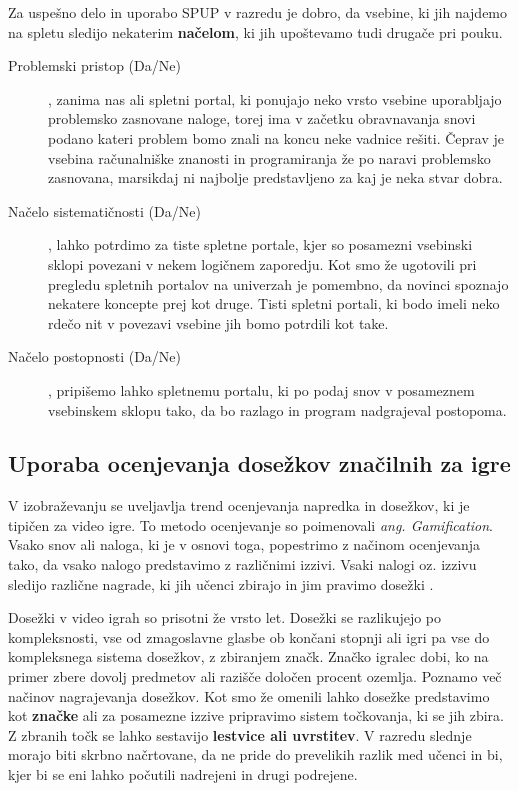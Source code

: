Za uspešno delo in uporabo SPUP v razredu je dobro, da vsebine, ki jih
najdemo na spletu sledijo nekaterim \textbf{načelom}, ki jih
upoštevamo tudi drugače pri pouku.

\begin{description}
\item[Problemski pristop (Da/Ne)], zanima nas ali spletni portal,
  ki ponujajo neko vrsto vsebine uporabljajo problemsko zasnovane
  naloge, torej ima v začetku obravnavanja snovi podano kateri problem
  bomo znali na koncu neke vadnice rešiti. Čeprav je vsebina 
  računalniške znanosti in programiranja že po naravi problemsko
  zasnovana, marsikdaj ni najbolje predstavljeno za kaj je neka stvar
  dobra.
\item[Načelo sistematičnosti (Da/Ne)], lahko potrdimo za tiste
  spletne portale, kjer so posamezni vsebinski sklopi povezani v nekem
  logičnem zaporedju. Kot smo že ugotovili pri pregledu spletnih
  portalov na univerzah je pomembno, da novinci spoznajo nekatere
  koncepte prej kot druge. Tisti spletni portali, ki bodo imeli neko
  rdečo nit v povezavi vsebine jih bomo potrdili kot take.
\item[Načelo postopnosti (Da/Ne)], pripišemo lahko spletnemu portalu,
  ki po podaj snov v posameznem vsebinskem sklopu tako, da bo razlago
  in program nadgrajeval postopoma. 
\end{description}

\subsection{Uporaba ocenjevanja dosežkov značilnih za igre}
\label{sec:uporaba_dosežkov}

V izobraževanju se uveljavlja trend ocenjevanja napredka in dosežkov,
ki je tipičen za video igre. To metodo ocenjevanje so poimenovali
\emph{ang. Gamification}. Vsako snov ali naloga, ki je v osnovi toga,
popestrimo z načinom ocenjevanja tako, da vsako nalogo predstavimo z
različnimi izzivi. Vsaki nalogi oz. izzivu sledijo različne nagrade,
ki jih učenci zbirajo in jim pravimo dosežki \cite{web:edublogger}.

Dosežki v video igrah so prisotni že vrsto let. Dosežki se razlikujejo
po kompleksnosti, vse od zmagoslavne glasbe ob končani stopnji ali
igri pa vse do kompleksnega sistema dosežkov, z zbiranjem
značk. Značko igralec dobi, ko na primer zbere dovolj predmetov ali
razišče določen procent ozemlja. Poznamo več načinov nagrajevanja
dosežkov. Kot smo že omenili lahko dosežke predstavimo kot
\textbf{značke} ali za posamezne izzive pripravimo sistem točkovanja,
ki se jih zbira. Z zbranih točk se lahko sestavijo \textbf{lestvice
  ali uvrstitev}. V razredu slednje morajo biti skrbno načrtovane, da
ne pride do prevelikih razlik med učenci in bi, kjer bi se eni lahko
počutili nadrejeni in drugi podrejene.

